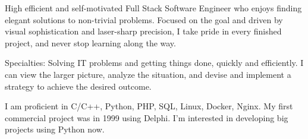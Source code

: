 
\begin{cvparagraph}

High efficient and self-motivated Full Stack Software Engineer who enjoys
finding elegant solutions to non-trivial problems. Focused on the goal and
driven by visual sophistication and laser-sharp precision, I take pride in
every finished project, and never stop learning along the way.

Specialties: Solving IT problems and getting things done, quickly and efficiently.
I can view the larger picture, analyze the situation, and devise and implement a
strategy to achieve the desired outcome.

I am proficient in C/C++, Python, PHP, SQL, Linux, Docker, Nginx. My first commercial
project was in 1999 using Delphi. I'm interested in developing big projects using
Python now.

\end{cvparagraph}
